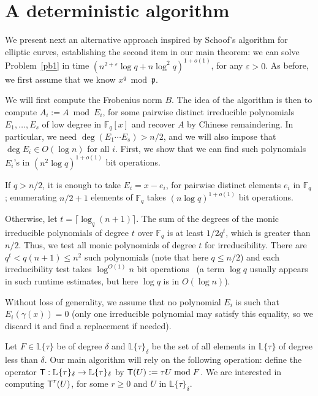 \documentclass[sigconf]{acmart}
\newcommand{\F}{\mathbb{F}}
\renewcommand{\L}{\mathbb{L}}
\newcommand{\ang}[1]{\{#1\}}
\newcommand{\frakp}{\mathfrak{p}}
\begin{document}

\section{A deterministic algorithm}\label{sec:schoof}

We present next an alternative approach inspired by Schoof's algorithm
for elliptic curves, establishing the second item in our main theorem:
we can solve Problem~\ref{pb1} in time $(n^{2+\varepsilon} \log q + n
\log^2 q)^{1+o(1)}$, for any $\varepsilon > 0$. As before, we first assume 
that we know $x^q \bmod \frakp$.

\smallskip{} We will first compute the Frobenius norm
$B$. The idea of the algorithm is then to compute $A_i:=A \bmod E_i$,
for some pairwise distinct irreducible polynomials $E_1,\dots,E_s$ of
low degree in $\F_q[x]$ and recover $A$ by Chinese remaindering.  In
particular, we need $\deg(E_1 \cdots E_s) > n/2$, and we will also
impose that $\deg E_i \in O(\log n)$ for all $i$. First, we show that
we can find such polynomials $E_i$'s in $(n^2 \log q)^{1+o(1)}$ bit
operations.

If $q > n/2$, it is enough to take $E_i = x-e_i$, for pairwise
distinct elements $e_i$ in $\F_q$; enumerating $n/2+1$ elements of
$\F_q$ takes $(n \log q)^{1+o(1)}$ bit operations.

Otherwise, let $t= \lceil \log_q (n+1)\rceil$. The sum of the degrees
of the monic irreducible polynomials of degree $t$ over $\F_q$ is at
least $1/2 q^t$, which is greater than $n/2$. Thus, we test all monic
polynomials of degree $t$ for irreducibility. There are $q^t < q(n+1)
\le n^2$ such polynomials (note that here $q \le n/2$) and each
irreducibility test takes $\log^{O(1)} n$ bit
operations~\cite{vonzurGathen1992} (a term $\log q$ usually appears in
such runtime estimates, but here $\log q$ is in $O(\log n)$).

Without loss of generality, we assume that no polynomial $E_i$ is
such that $E_i(\gamma(x))=0$ (only one irreducible polynomial may
satisfy this equality, so we discard it and find a replacement if
needed).

\smallskip{} Let $F \in\L\ang{\tau}$ be of degree
$\delta$ and $\L\ang{\tau}_{\delta}$ be the set of all elements in
$\L\ang{\tau}$ of degree less than $\delta$. Our main algorithm will
rely on the following operation: define the operator $\text{\sf
  T}:\L\ang{\tau}_{\delta} \to \L\ang{\tau}_{\delta}$ by $\text{\sf
  T}(U) := \tau U \bmod F$.  We are interested in computing $\text{\sf
  T}^r(U)$, for some $r \ge 0$ and $U$ in
$\L\ang{\tau}_{\delta}$.
\end{document}
